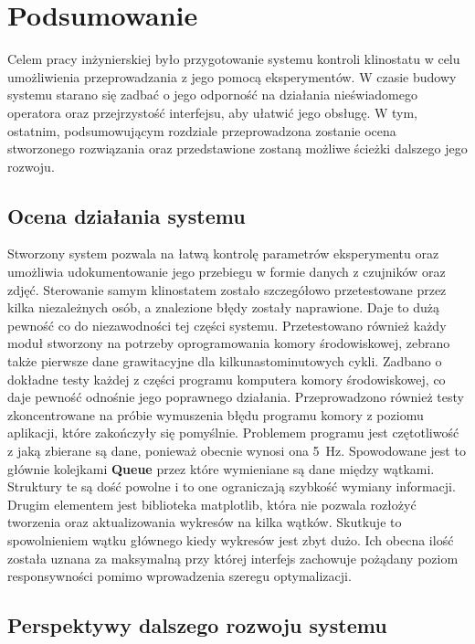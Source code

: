 \chapter{Podsumowanie}

Celem pracy inżynierskiej było przygotowanie systemu kontroli klinostatu w celu umożliwienia przeprowadzania z jego pomocą eksperymentów. W czasie budowy systemu starano się zadbać o jego odporność na działania nieświadomego operatora oraz przejrzystość interfejsu, aby ułatwić jego obsługę. W tym, ostatnim, podsumowującym rozdziale przeprowadzona zostanie ocena stworzonego rozwiązania oraz przedstawione zostaną możliwe ścieżki dalszego jego rozwoju.


\section{Ocena działania systemu}

Stworzony system pozwala na łatwą kontrolę parametrów eksperymentu oraz umożliwia udokumentowanie jego przebiegu w formie danych z czujników oraz zdjęć. Sterowanie samym klinostatem zostało szczegółowo przetestowane przez kilka niezależnych osób, a znalezione błędy zostały naprawione. Daje to dużą pewność co do niezawodności tej części systemu. Przetestowano również każdy moduł stworzony na potrzeby oprogramowania komory środowiskowej, zebrano także pierwsze dane grawitacyjne dla kilkunastominutowych cykli. Zadbano o dokładne testy każdej z części programu komputera komory środowiskowej, co daje pewność odnośnie jego poprawnego działania. Przeprowadzono również testy zkoncentrowane na próbie wymuszenia błędu programu komory z poziomu aplikacji, które zakończyły się pomyślnie. Problemem programu jest czętotliwość z jaką zbierane są dane, ponieważ obecnie wynosi ona \SI{5}{Hz}. Spowodowane jest to głównie kolejkami \textbf{Queue} przez które wymieniane są dane między wątkami. Struktury te są dość powolne i to one ograniczają szybkość wymiany informacji. Drugim elementem jest biblioteka matplotlib, która nie pozwala rozłożyć tworzenia oraz aktualizowania wykresów na kilka wątków. Skutkuje to spowolnieniem wątku głównego kiedy wykresów jest zbyt dużo. Ich obecna ilość została uznana za maksymalną przy której interfejs zachowuje pożądany poziom responsywności pomimo wprowadzenia szeregu optymalizacji.

\section{Perspektywy  dalszego rozwoju systemu}

